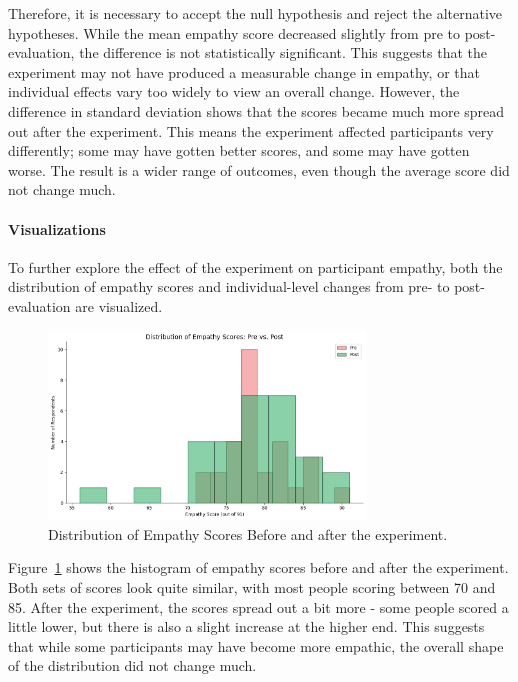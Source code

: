 \vspace{1em}

Therefore, it is necessary to accept the null hypothesis and reject the alternative hypotheses. While the mean empathy score decreased slightly from pre to post-evaluation, the difference is not statistically significant. This suggests that the experiment may not have produced a measurable change in empathy, or that individual effects vary too widely to view an overall change. However, the difference in standard deviation shows that the scores became much more spread out after the experiment. This means the experiment affected participants very differently; some may have gotten better scores, and some may have gotten worse. The result is a wider range of outcomes, even though the average score did not change much.

\paragraph{Visualizations}

To further explore the effect of the experiment on participant empathy, both the distribution of empathy scores and individual-level changes from pre- to post-evaluation are visualized. 

\begin{figure}[htbp]
    \centering
    \includegraphics[width=0.75\textwidth]{../../Figures/emp-comparison.png}
    \caption{Distribution of Empathy Scores Before and after the experiment.}
    \label{fig:empathy_dist_hist}
\end{figure}

Figure~\ref{fig:empathy_dist_hist} shows the histogram of empathy scores before and after the experiment. Both sets of scores look quite similar, with most people scoring between 70 and 85. After the experiment, the scores spread out a bit more - some people scored a little lower, but there is also a slight increase at the higher end. This suggests that while some participants may have become more empathic, the overall shape of the distribution did not change much.

